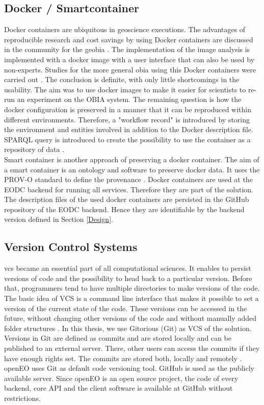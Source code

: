\documentclass[draft,final]{vutinfth} %
\begin{document}
\subsection{Docker / Smartcontainer}\label{Smartcontainer}
Docker containers are ubiquitous in geoscience executions. The advantages of reproducible research and cost savings by using Docker containers are discussed in the community for the \gls{geobia} \cite{rs9030290}. The implementation of the image analysis is implemented with a docker image with a user interface that can also be used by non-experts. Studies for the more general \gls{obia} using this Docker containers were carried out \cite{proceedings456}. The conclusion is definite, with only little shortcomings in the usability. The aim was to use docker images to make it easier for scientists to re-run an experiment on the OBIA system. The remaining question is how the docker configuration is preserved in a manner that it can be reproduced within different environments. Therefore, a "workflow record" is introduced by storing the environment and entities involved in addition to the Docker description file. SPARQL query is introduced to create the possibility to use the container as a repository of data \cite{emsley2017a}.\\ 
Smart container is another approach of preserving a docker container. The aim of a smart container is an ontology and software to preserve docker data. It uses the PROV-O standard to define the provenance \cite{Huo2015SmartCA}. 
Docker containers are used at the EODC backend for running all services. Therefore they are part of the solution. The description files of the used docker containers are persisted in the GitHub repository of the EODC backend. Hence they are identifiable by the backend version defined in Section \ref{Design}.   
\newpage
\subsection{Version Control Systems}\label{Version Control Systems}
\gls{vcs} became an essential part of all computational sciences. It enables to persist versions of code and the possibility to head back to a particular version. Before that, programmers tend to have multiple directories to make versions of the code. The basic idea of VCS is a command line interface that makes it possible to set a version of the current state of the code. These versions can be accessed in the future, without changing other versions of the code and without manually added folder structures \cite{10.1109/MCSE.2009.194}. 
In this thesis, we use Gitorious (Git) as VCS of the solution. Versions in Git are defined as commits and are stored locally and can be published to an external server. There, other users can access the commits if they have enough rights set. The commits are stored both, locally and remotely \cite{QuickGit}. openEO uses Git as default code versioning tool. GitHub is used as the publicly available server. Since openEO is an open source project, the code of every backend, core API and the client software is available at GitHub without restrictions. 
\end{document}
